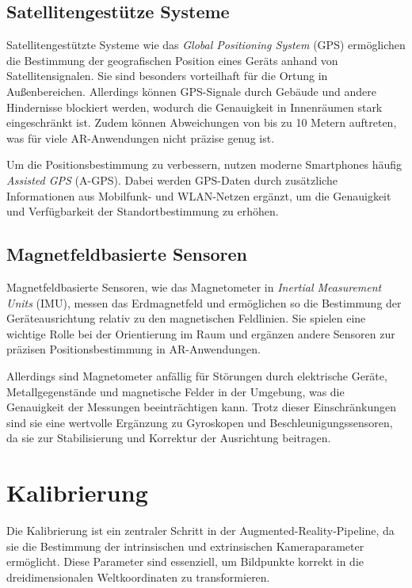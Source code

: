 \subsection{Satellitengestütze Systeme}

Satellitengestützte Systeme wie das \emph{Global Positioning System} (GPS) ermöglichen die Bestimmung der geografischen Position eines Geräts anhand von Satellitensignalen. Sie sind besonders vorteilhaft für die Ortung in Außenbereichen. Allerdings können GPS-Signale durch Gebäude und andere Hindernisse blockiert werden, wodurch die Genauigkeit in Innenräumen stark eingeschränkt ist. Zudem können Abweichungen von bis zu 10 Metern auftreten, was für viele AR-Anwendungen nicht präzise genug ist.

Um die Positionsbestimmung zu verbessern, nutzen moderne Smartphones häufig \emph{Assisted GPS} (A-GPS). Dabei werden GPS-Daten durch zusätzliche Informationen aus Mobilfunk- und WLAN-Netzen ergänzt, um die Genauigkeit und Verfügbarkeit der Standortbestimmung zu erhöhen. \cite{doerner2022virtual}

\subsection{Magnetfeldbasierte Sensoren}

Magnetfeldbasierte Sensoren, wie das Magnetometer in \emph{Inertial Measurement Units} (IMU), messen das Erdmagnetfeld und ermöglichen so die Bestimmung der Geräteausrichtung relativ zu den magnetischen Feldlinien. Sie spielen eine wichtige Rolle bei der Orientierung im Raum und ergänzen andere Sensoren zur präzisen Positionsbestimmung in AR-Anwendungen. \cite{doerner2022virtual}

Allerdings sind Magnetometer anfällig für Störungen durch elektrische Geräte, Metallgegenstände und magnetische Felder in der Umgebung, was die Genauigkeit der Messungen beeinträchtigen kann. Trotz dieser Einschränkungen sind sie eine wertvolle Ergänzung zu Gyroskopen und Beschleunigungssensoren, da sie zur Stabilisierung und Korrektur der Ausrichtung beitragen. \cite{doerner2022virtual}

\section{Kalibrierung}\label{Kalibrierung}

Die Kalibrierung ist ein zentraler Schritt in der Augmented-Reality-Pipeline, da sie die Bestimmung der intrinsischen und extrinsischen Kameraparameter ermöglicht. Diese Parameter sind essenziell, um Bildpunkte korrekt in die dreidimensionalen Weltkoordinaten zu transformieren. \cite{mw2024calibration}

